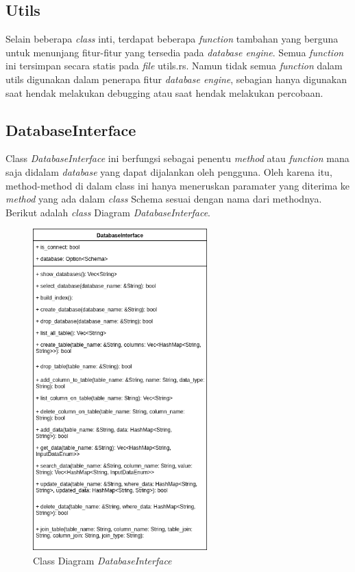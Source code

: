 \subsection{Utils}
Selain beberapa \emph{class} inti, terdapat beberapa \emph{function} tambahan yang berguna untuk menunjang fitur-fitur yang tersedia pada \emph{database engine}. Semua \emph{function} ini tersimpan secara statis
pada \emph{file} utils.rs. Namun tidak semua \emph{function} dalam utils digunakan dalam penerapa fitur \emph{database engine}, sebagian hanya digunakan saat hendak melakukan debugging atau saat hendak melakukan
percobaan.

\subsection{DatabaseInterface}
Class \emph{DatabaseInterface} ini berfungsi sebagai penentu \emph{method} atau \emph{function} mana saja didalam \emph{database} yang dapat dijalankan oleh pengguna. Oleh karena itu, method-method di dalam class
ini hanya meneruskan paramater yang diterima ke \emph{method} yang ada dalam \emph{class} Schema sesuai dengan nama dari methodnya. Berikut adalah \emph{class} Diagram \emph{DatabaseInterface}.

\begin{figure}[H]
  \centering{}
	\includegraphics[width=0.6\textwidth]{gambar/bab4/DatabaseInterface.png}
  \caption{Class Diagram \emph{DatabaseInterface}}
\end{figure}

